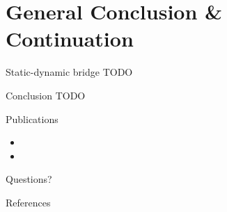 \documentclass[12pt,aspectratio=169]{beamer}
\newcommand{\themename}{\textbf{\textsc{metropolis}}\xspace}
\begin{document}
%
%
%
\section{General Conclusion \& Continuation}

\begin{frame}{Static-dynamic bridge}
  TODO
\end{frame}

\begin{frame}{Conclusion}
  TODO
\end{frame}

\begin{frame}[allowframebreaks]{Publications}
  \small
  \begin{itemize}
    \item {}
    \item {}
  \end{itemize}
\end{frame}

{
\begin{frame}[standout]
  Questions?
\end{frame}
}

\appendix

\begin{frame}[allowframebreaks]{References}
  \printbibliography[heading=none]
\end{frame}

%
%
\end{document}
